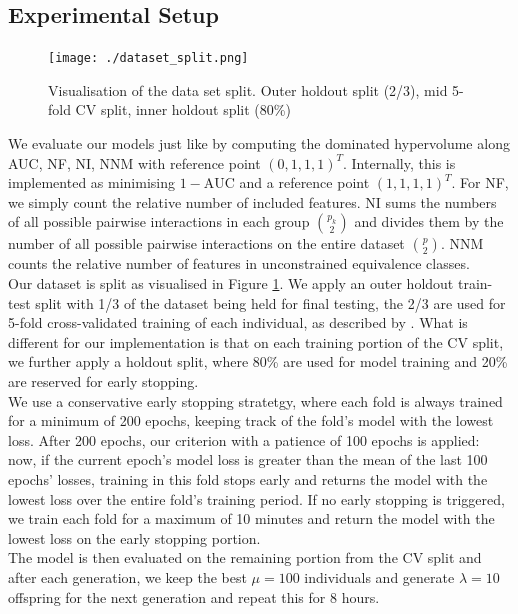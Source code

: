 \documentclass[twoside,11pt]{article}
\begin{document}
\subsection{Experimental Setup}
\begin{figure}
  \centering
  \texttt{[image: ./dataset\_split.png]}
  \caption{Visualisation of the data set split. Outer holdout split (2/3), mid 5-fold CV split, inner holdout split (80\%)}
  \label{fig-dataset-split}
\end{figure}
We evaluate our models just like \citet[pp. 543f]{EAGGA} by computing the dominated hypervolume along AUC, NF, NI, NNM with reference point $(0, 1, 1, 1)^T$.
Internally, this is implemented as minimising $1-\text{AUC}$ and a reference point $(1, 1, 1, 1)^T$.
For NF, we simply count the relative number of included features.
NI sums the numbers of all possible pairwise interactions in each group ${p_k \choose 2}$ and divides them by the number of all possible pairwise interactions
on the entire dataset ${p \choose 2}$.
NNM counts the relative number of features in unconstrained equivalence classes.
\\
Our dataset is split as visualised in Figure \ref{fig-dataset-split}.
We apply an outer holdout train-test split with 1/3 of the dataset being held for final testing, the 2/3 are used for 5-fold cross-validated training of each individual,
as described by \citet[p. 543]{EAGGA}.
What is different for our implementation is that on each training portion of the CV split, we further apply a holdout split, where 80\% are used for model training and
20\% are reserved for early stopping.
\\
We use a conservative early stopping stratetgy, where each fold is always trained for a minimum of 200 epochs, keeping track of the fold's model with the lowest loss.
After 200 epochs, our criterion with a patience of 100 epochs is applied: now, if the current epoch's model loss is greater than the mean of the last 100 epochs'
losses, training in this fold stops early and returns the model with the lowest loss over the entire fold's training period.
If no early stopping is triggered, we train each fold for a maximum of 10 minutes and return the model with the lowest loss on the early stopping portion.
\\
The model is then evaluated on the remaining portion from the CV split and after each generation, we keep the best $\mu=100$ individuals and generate $\lambda=10$
offspring for the next generation and repeat this for 8 hours.
\\
\end{document}
